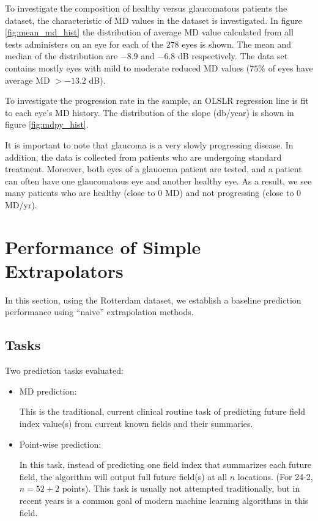 To investigate the composition of healthy versus glaucomatous patients the dataset, the characteristic of MD values in the dataset is investigated. In figure \ref{fig:mean_md_hist} the distribution of average MD value calculated from all tests administers on an eye for each of the $278$ eyes is shown. The mean and median of the distribution are $-8.9$ and $-6.8$ dB respectively. The data set contains mostly eyes with mild to moderate reduced MD values ($75\%$ of eyes have average MD $>-13.2$ dB).

To investigate the progression rate in the sample, an \ac{OLSLR} regression line is fit to each eye's MD history. The distribution of the slope (db/year) is shown in figure \ref{fig:mdpy_hist}. 

It is important to note that glaucoma is a very slowly progressing disease. In addition, the data is collected from patients who are undergoing standard treatment. Moreover, both eyes of a glauocma patient are tested, and a patient can often have one glaucomatous eye and another healthy eye. As a result, we see many patients who are healthy (close to $0$ MD) and not progressing (close to $0$ MD/yr).

\section{Performance of Simple Extrapolators}

In this section, using the Rotterdam dataset, we establish a baseline prediction performance using ``naive'' extrapolation methods. 

\subsection{Tasks}

Two prediction tasks evaluated:

\begin{itemize}
	\item \ac{MD} prediction:
	
	This is the traditional, current clinical routine task of predicting future field index value(s) from current known fields and their summaries. 
	
	\item Point-wise prediction:
	
	In this task, instead of predicting one field index that summarizes each future field, the algorithm will output full future field(s) at all $n$ locations. (For 24-2, $n=52+2$ points). This task is usually not attempted traditionally, but in recent years is a common goal of modern machine learning algorithms in this field.
	
\end{itemize}


